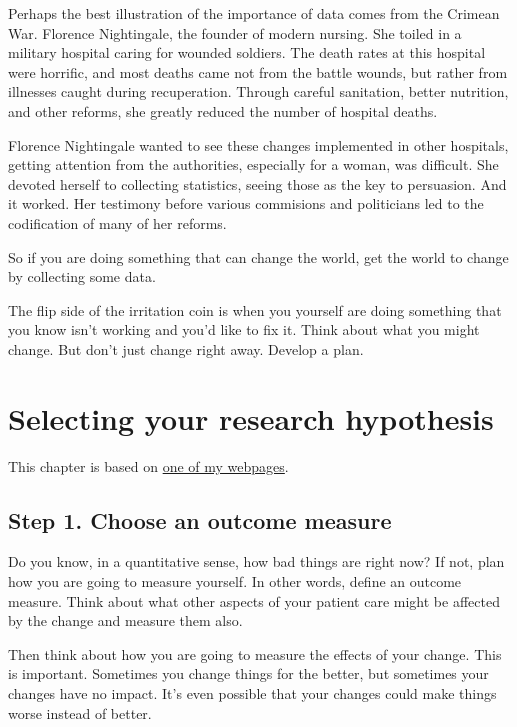 \documentclass[
  letterpaper,
  DIV=11,
  numbers=noendperiod]{scrreprt}
\begin{document}
Perhaps the best illustration of the importance of data comes from the
Crimean War. Florence Nightingale, the founder of modern nursing. She
toiled in a military hospital caring for wounded soldiers. The death
rates at this hospital were horrific, and most deaths came not from the
battle wounds, but rather from illnesses caught during recuperation.
Through careful sanitation, better nutrition, and other reforms, she
greatly reduced the number of hospital deaths.

Florence Nightingale wanted to see these changes implemented in other
hospitals, getting attention from the authorities, especially for a
woman, was difficult. She devoted herself to collecting statistics,
seeing those as the key to persuasion. And it worked. Her testimony
before various commisions and politicians led to the codification of
many of her reforms.

So if you are doing something that can change the world, get the world
to change by collecting some data.

The flip side of the irritation coin is when you yourself are doing
something that you know isn't working and you'd like to fix it. Think
about what you might change. But don't just change right away. Develop a
plan.


\chapter{Selecting your research
hypothesis}\label{selecting-your-research-hypothesis}

This chapter is based on
\href{http://www.new.pmean.com/steps-in-developing-research-hypothesis/}{one
of my webpages}.

\section{Step 1. Choose an outcome
measure}\label{step-1.-choose-an-outcome-measure}

Do you know, in a quantitative sense, how bad things are right now? If
not, plan how you are going to measure yourself. In other words, define
an outcome measure. Think about what other aspects of your patient care
might be affected by the change and measure them also.

Then think about how you are going to measure the effects of your
change. This is important. Sometimes you change things for the better,
but sometimes your changes have no impact. It's even possible that your
changes could make things worse instead of better.
\end{document}
